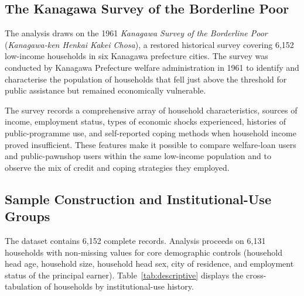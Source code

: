\documentclass[12pt]{article}
\begin{document}
\subsection{The Kanagawa Survey of the Borderline Poor}

The analysis draws on the 1961 \textit{Kanagawa Survey of the Borderline Poor} (\textit{Kanagawa-ken Henkai Kakei Chosa}), a restored historical survey covering 6,152 low-income households in six Kanagawa prefecture cities. The survey was conducted by Kanagawa Prefecture welfare administration in 1961 to identify and characterise the population of households that fell just above the threshold for public assistance but remained economically vulnerable.

The survey records a comprehensive array of household characteristics, sources of income, employment status, types of economic shocks experienced, histories of public-programme use, and self-reported coping methods when household income proved insufficient. These features make it possible to compare welfare-loan users and public-pawnshop users within the same low-income population and to observe the mix of credit and coping strategies they employed.

\subsection{Sample Construction and Institutional-Use Groups}

The dataset contains 6,152 complete records. Analysis proceeds on 6,131 households with non-missing values for core demographic controls (household head age, household size, household head sex, city of residence, and employment status of the principal earner). Table~\ref{tab:descriptive} displays the cross-tabulation of households by institutional-use history.
\end{document}
